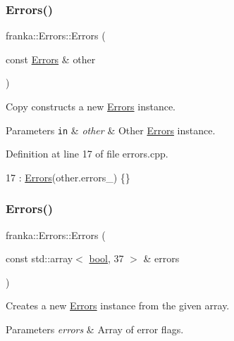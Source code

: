 \subsubsection{\texorpdfstring{Errors()}{Errors()}\hspace{0.1cm}{\footnotesize\ttfamily [2/3]}}
{\footnotesize\ttfamily franka\+::\+Errors\+::\+Errors (\begin{DoxyParamCaption}\item[{const \hyperlink{structfranka_1_1Errors}{Errors} \&}]{other }\end{DoxyParamCaption})}

Copy constructs a new \hyperlink{structfranka_1_1Errors}{Errors} instance.


\begin{DoxyParams}[1]{Parameters}
\mbox{\tt in}  & {\em other} & Other \hyperlink{structfranka_1_1Errors}{Errors} instance. \\
\hline
\end{DoxyParams}


Definition at line 17 of file errors.\+cpp.


\begin{DoxyCode}
17 : \hyperlink{structfranka_1_1Errors_aedd6b6af230c01b6f106b5050b29d9ae}{Errors}(other.errors\_) \{\}
\end{DoxyCode}
\mbox{\label{structfranka_1_1Errors_a5f89cf2815adc679e232dcc6b8308c1b}} 
\subsubsection{\texorpdfstring{Errors()}{Errors()}\hspace{0.1cm}{\footnotesize\ttfamily [3/3]}}
{\footnotesize\ttfamily franka\+::\+Errors\+::\+Errors (\begin{DoxyParamCaption}\item[{const std\+::array$<$ \hyperlink{classbool}{bool}, 37 $>$ \&}]{errors }\end{DoxyParamCaption})}

Creates a new \hyperlink{structfranka_1_1Errors}{Errors} instance from the given array.


\begin{DoxyParams}{Parameters}
{\em errors} & Array of error flags. \\
\hline
\end{DoxyParams}


